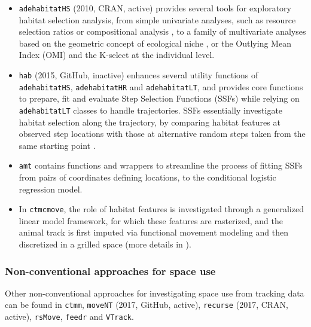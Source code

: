 \documentclass[a4paper,12pt]{article}
\newcommand{\Rpkg}[1]{\texttt{#1}}
\begin{document}
\begin{itemize}
	\item \Rpkg{adehabitatHS} (2010, CRAN, active) provides several tools for exploratory habitat selection analysis, from simple univariate analyses, such as resource selection ratios \citep{Manly2007} or compositional analysis \citep{Aebischer1993}, to a family of multivariate analyses based on the geometric concept of ecological niche \citep{Hutchinson1957}, or the Outlying Mean Index (OMI) \citep{Doledec2000} and the K-select \citep{Calenge2005} at the individual level.
	\item \Rpkg{hab} (2015, GitHub, inactive) enhances several utility functions of \Rpkg{adehabitatHS}, \Rpkg{adehabitatHR} and \Rpkg{adehabitatLT}, and provides core functions to prepare, fit and evaluate Step Selection Functions (SSFs) \citep{Fortin2005} while relying on \Rpkg{adehabitatLT} classes to handle trajectories. SSFs essentially investigate habitat selection along the trajectory, by comparing habitat features at observed step locations with those at alternative random steps taken from the same starting point \citep{Thurfjell2014}.
	\item \Rpkg{amt} contains functions and wrappers to streamline the process of fitting SSFs from pairs of coordinates defining locations, to the conditional logistic regression model.
	\item In \Rpkg{ctmcmove}, the role of habitat features is investigated through a generalized linear model framework, for which these features are rasterized, and the animal track is first imputed via functional movement modeling and then discretized in a grilled space (more details in \cite{Hanks2015}). 
\end{itemize}

\subsubsection*{Non-conventional approaches for space use}

Other non-conventional approaches for investigating space use from tracking data can be found in \Rpkg{ctmm}, \Rpkg{moveNT} (2017, GitHub, active), \Rpkg{recurse} (2017, CRAN, active), \Rpkg{rsMove}, \Rpkg{feedr} and \Rpkg{VTrack}. 
\end{document}
